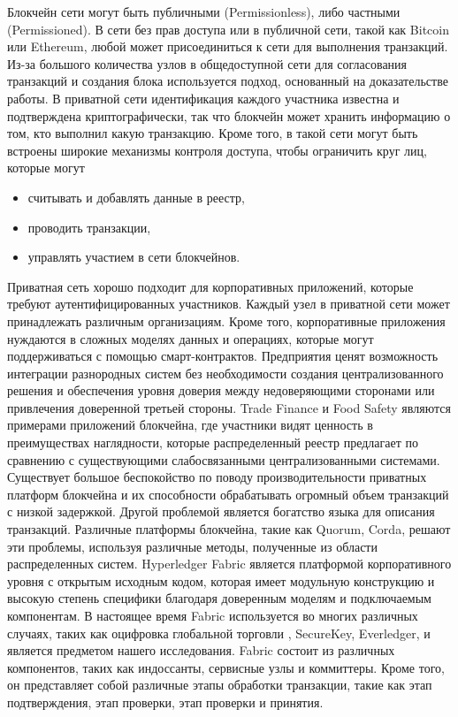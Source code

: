 Блокчейн сети могут быть публичными (Permissionless), либо частными (Permissioned). В сети без прав доступа или в публичной сети, такой как Bitcoin или Ethereum, любой может присоединиться к сети для выполнения транзакций. Из-за большого количества узлов в общедоступной сети для согласования транзакций и создания блока используется подход, основанный на доказательстве работы. В приватной сети идентификация каждого участника известна и подтверждена криптографически, так что блокчейн может хранить информацию о том, кто выполнил какую транзакцию. Кроме того, в такой сети могут быть встроены широкие механизмы контроля доступа, чтобы ограничить круг лиц, которые могут
\begin{itemize}
	\item считывать и добавлять данные в реестр,
	\item проводить транзакции,
	\item управлять участием в сети блокчейнов.
\end{itemize}
Приватная сеть хорошо подходит для корпоративных приложений, которые требуют аутентифицированных участников. Каждый узел в приватной сети может принадлежать различным организациям. Кроме того, корпоративные приложения нуждаются в сложных моделях данных и операциях, которые могут поддерживаться с помощью смарт-контрактов. Предприятия ценят возможность интеграции разнородных систем без необходимости создания централизованного решения и обеспечения уровня доверия между недоверяющими сторонами или привлечения доверенной третьей стороны. Trade Finance и Food Safety являются примерами приложений блокчейна, где участники видят ценность в преимуществах наглядности, которые распределенный реестр предлагает по сравнению с существующими слабосвязанными централизованными системами. Существует большое беспокойство по поводу производительности приватных платформ блокчейна и их способности обрабатывать огромный объем транзакций с низкой задержкой. Другой проблемой является богатство языка для описания транзакций. Различные платформы блокчейна, такие как Quorum, Corda, решают эти проблемы, используя различные методы, полученные из области распределенных систем. Hyperledger Fabric является платформой корпоративного уровня с открытым исходным кодом, которая имеет модульную конструкцию и высокую степень специфики благодаря доверенным моделям и подключаемым компонентам. В настоящее время Fabric используется во многих различных случаях, таких как оцифровка глобальной торговли , SecureKey, Everledger, и является предметом нашего исследования. Fabric состоит из различных компонентов, таких как индоссанты, сервисные узлы и коммиттеры. Кроме того, он представляет собой различные этапы обработки транзакции, такие как этап подтверждения, этап проверки, этап проверки и принятия.


